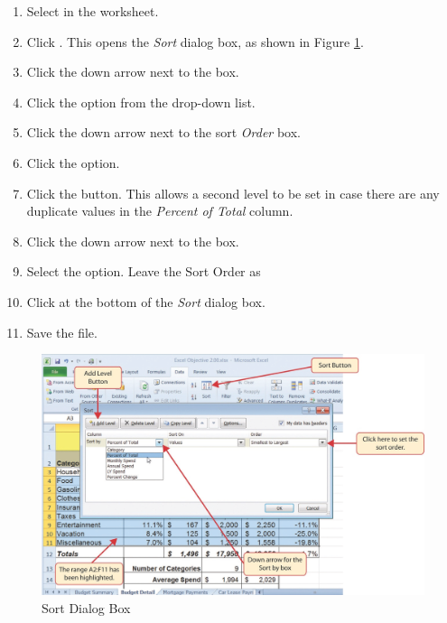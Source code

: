\begin{enumerate}
	\item Select  in the  worksheet.
	\item Click . This opens the \textit{Sort} dialog box, as shown in Figure \ref{02:fig27}.
	\item Click the down arrow next to the  box.
	\item Click the  option from the drop-down list.
	\item Click the down arrow next to the sort \textit{Order} box.
	\item Click the  option.
	\item Click the  button. This allows a second level to be set in case there are any duplicate values in the \textit{Percent of Total} column.
	\item Click the down arrow next to the  box.
	\item Select the  option. Leave the Sort Order as 
	\item Click  at the bottom of the \textit{Sort} dialog box.
	\item Save the  file.
\end{enumerate}

\begin{figure}[H]
	\centering
	\includegraphics[width=\maxwidth{.95\linewidth}]{gfx/ch02_fig27}
	\caption{Sort Dialog Box}
	\label{02:fig27}
\end{figure}

